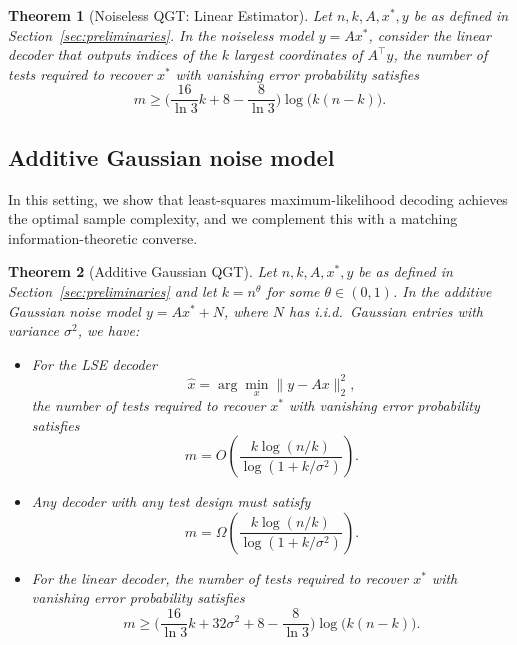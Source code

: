 \documentclass{article}
\newtheorem{theorem}{Theorem}
\begin{document}
\begin{theorem}[Noiseless QGT: Linear Estimator]\label{thm:noiselessQGT}
Let $n,k,A,x^*,y$ be as defined in Section~\ref{sec:preliminaries}. 
In the noiseless model $y = Ax^*$, consider the linear decoder that outputs indices of the $k$ largest coordinates of $A^\top y$,
the number of tests required to recover $x^*$ with vanishing error probability satisfies
\[
m\ge \bigl(\frac{16}{\ln3}k+8-\frac{8}{\ln3}\bigr)\log\bigl(k(n-k)\bigr).
\]
\end{theorem}

\subsection{Additive Gaussian noise model}
In this setting, we show that least-squares maximum-likelihood decoding achieves the optimal sample complexity, and we complement this with a matching information-theoretic converse.
\begin{theorem}[Additive Gaussian QGT]\label{thm:gaussianQGT}
Let $n,k,A,x^*,y$ be as defined in Section~\ref{sec:preliminaries} and let $k=n^\theta$ for some $\theta\in(0,1)$. In the additive Gaussian noise model $y = Ax^* + N$, where $N$ has i.i.d.\ Gaussian entries with variance $\sigma^2$, we have:
\begin{itemize}

  \item For the LSE decoder
    \[
    \widehat{x} = \arg\min_x \|y - A x\|_2^2,
    \] 
    the number of tests required to recover $x^*$ with vanishing error probability satisfies
  \[
  m = O\!\left(\frac{k\log(n/k)}{\log(1 + k/\sigma^2)}\right).
  \]
  \item Any decoder with any test design must satisfy 
  \[m = \Omega\!\left(\frac{k\log(n/k)}{\log(1 + k/\sigma^2)}\right).\]
  \item For the linear decoder,
  the number of tests required to recover $x^*$ with vanishing error probability satisfies
    \[
    m\ge \bigl(\frac{16}{\ln3}k+32\sigma^2+8-\frac{8}{\ln3}\bigr)\log\bigl(k(n-k)\bigr).
    \]
\end{itemize}
\end{theorem}
\end{document}
